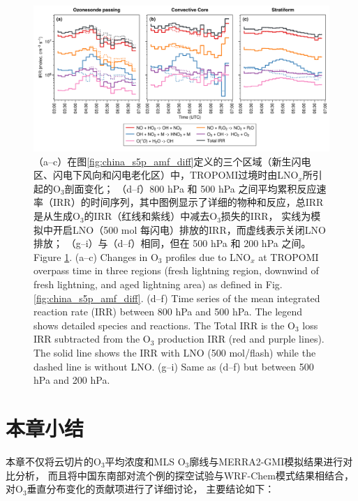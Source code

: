 \begin{figure}[h]
    \includegraphics[width=16cm]{./figures/irr_timeseries.png}
    \caption{
    （a--c）在图\ref{fig:china_s5p_amf_diff}定义的三个区域（新生闪电区、闪电下风向和闪电老化区）中，TROPOMI过境时由LNO$_x$所引起的O$_3$剖面变化；
    （d--f）800 hPa 和 500 hPa 之间平均累积反应速率（IRR）的时间序列，其中图例显示了详细的物种和反应，总IRR是从生成O$_3$的IRR（红线和紫线）中减去O$_3$损失的IRR，
     实线为模拟中开启LNO（500 mol 每闪电）排放的IRR，而虚线表示关闭LNO排放；
    （g--i）与（d--f）相同，但在 500 hPa 和 200 hPa 之间。\\
    Figure \ref{fig:irr_timeseries}. (a--c) Changes in O$_3$ profiles due to LNO$_x$ at TROPOMI overpass time in three regions (fresh lightning region, downwind of fresh lightning, and aged lightning area) as defined in Fig. \ref{fig:china_s5p_amf_diff}.
    (d--f) Time series of the mean integrated reaction rate (IRR) between 800 hPa and 500 hPa.
    The legend shows detailed species and reactions.
    The Total IRR is the O$_3$ loss IRR subtracted from the O$_3$ production IRR (red and purple lines).
    The solid line shows the IRR with LNO (500 mol/flash) while the dashed line is without LNO.
    (g--i) Same as (d--f) but between 500 hPa and 200 hPa.
    }
    \label{fig:irr_timeseries}
\end{figure}

\section{本章小结}


本章不仅将云切片的O$_3$平均浓度和MLS O$_3$廓线与MERRA2-GMI模拟结果进行对比分析，
而且将中国东南部对流个例的探空试验与WRF-Chem模式结果相结合，对O$_3$垂直分布变化的贡献项进行了详细讨论，
主要结论如下：

